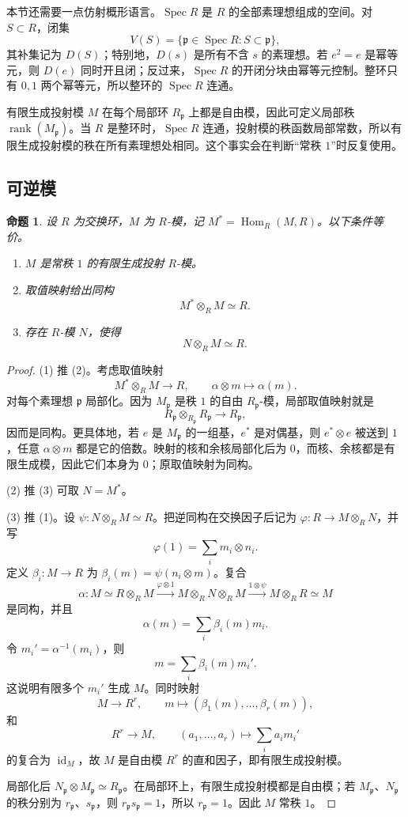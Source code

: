 \documentclass[11pt,a4paper,openany]{ctexbook}
\numberwithin{equation}{chapter}
\newcommand{\Spec}{\operatorname{Spec}}
\newcommand{\Hom}{\operatorname{Hom}}
\theoremstyle{plain}
\newtheorem{proposition}[theorem]{命题}
\theoremstyle{definition}
\theoremstyle{remark}
\begin{document}
本节还需要一点仿射概形语言。$\Spec R$ 是 $R$ 的全部素理想组成的空间。对
$S\subset R$，闭集
\[
V(S)=\{\mathfrak p\in\Spec R:S\subset\mathfrak p\},
\]
其补集记为 $D(S)$；特别地，$D(s)$ 是所有不含 $s$ 的素理想。若
$e^2=e$ 是幂等元，则 $D(e)$ 同时开且闭；反过来，$\Spec R$ 的开闭分块由幂等元控制。整环只有
$0,1$ 两个幂等元，所以整环的 $\Spec R$ 连通。

有限生成投射模 $M$ 在每个局部环 $R_{\mathfrak p}$ 上都是自由模，因此可定义局部秩
$\operatorname{rank}(M_{\mathfrak p})$。当 $R$ 是整环时，$\Spec R$ 连通，投射模的秩函数局部常数，所以有限生成投射模的秩在所有素理想处相同。这个事实会在判断“常秩
$1$”时反复使用。

\subsection{可逆模}

\begin{proposition}
设 $R$ 为交换环，$M$ 为 $R$-模，记 $M^*=\Hom_R(M,R)$。以下条件等价。
\begin{enumerate}[label=(\arabic*)]
\item $M$ 是常秩 $1$ 的有限生成投射 $R$-模。
\item 取值映射给出同构
\[
M^*\otimes_R M\simeq R.
\]
\item 存在 $R$-模 $N$，使得
\[
N\otimes_RM\simeq R.
\]
\end{enumerate}
\end{proposition}

\begin{proof}
(1) 推 (2)。考虑取值映射
\[
M^*\otimes_RM\longrightarrow R,\qquad
\alpha\otimes m\longmapsto\alpha(m).
\]
对每个素理想 $\mathfrak p$ 局部化。因为 $M_{\mathfrak p}$ 是秩 $1$ 的自由 $R_{\mathfrak p}$-模，局部取值映射就是
\[
R_{\mathfrak p}\otimes_{R_{\mathfrak p}}R_{\mathfrak p}\to R_{\mathfrak p},
\]
因而是同构。更具体地，若 $e$ 是 $M_{\mathfrak p}$ 的一组基，$e^*$ 是对偶基，则
$e^*\otimes e$ 被送到 $1$，任意 $\alpha\otimes m$ 都是它的倍数。映射的核和余核局部化后为
$0$，而核、余核都是有限生成模，因此它们本身为 $0$；原取值映射为同构。

(2) 推 (3) 可取 $N=M^*$。

(3) 推 (1)。设 $\psi:N\otimes_RM\simeq R$。把逆同构在交换因子后记为
$\varphi:R\to M\otimes_RN$，并写
\[
\varphi(1)=\sum_i m_i\otimes n_i.
\]
定义 $\beta_i:M\to R$ 为 $\beta_i(m)=\psi(n_i\otimes m)$。复合
\[
\alpha:M\simeq R\otimes_RM
\xrightarrow{\varphi\otimes1}
M\otimes_RN\otimes_RM
\xrightarrow{1\otimes\psi}
M\otimes_RR\simeq M
\]
是同构，并且
\[
\alpha(m)=\sum_i\beta_i(m)m_i.
\]
令 $m_i'=\alpha^{-1}(m_i)$，则
\[
m=\sum_i\beta_i(m)m_i'.
\]
这说明有限多个 $m_i'$ 生成 $M$。同时映射
\[
M\longrightarrow R^r,\qquad m\longmapsto(\beta_1(m),\dots,\beta_r(m)),
\]
和
\[
R^r\longrightarrow M,\qquad (a_1,\dots,a_r)\longmapsto\sum_i a_im_i'
\]
的复合为 $\operatorname{id}_M$，故 $M$ 是自由模 $R^r$ 的直和因子，即有限生成投射模。

局部化后 $N_{\mathfrak p}\otimes M_{\mathfrak p}\simeq R_{\mathfrak p}$。在局部环上，有限生成投射模都是自由模；若
$M_{\mathfrak p}$、$N_{\mathfrak p}$ 的秩分别为 $r_{\mathfrak p}$、$s_{\mathfrak p}$，则
$r_{\mathfrak p}s_{\mathfrak p}=1$，所以 $r_{\mathfrak p}=1$。因此 $M$ 常秩
$1$。
\end{proof}
\end{document}
